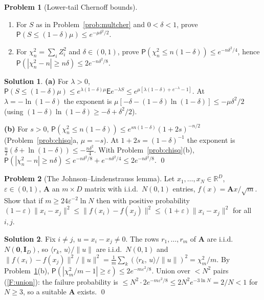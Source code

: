 \documentclass[12pt,a4paper]{article}
\theoremstyle{definition}
\newtheorem{exercise}{Problem}
\newtheorem*{solution*}{Solution}
\newcommand\expc{\mathsf{E}}
\newcommand\prb{\mathsf{P}}
\newcommand{\Real}{\mathbb{R}}
\newcommand{\bA}{\mathbf{A}}
\newcommand{\bI}{\mathbf{I}}
\newcommand{\bzero}{\mathbf{0}}
\newcommand{\ip}[2]{\langle #1,\, #2 \rangle}
\newcommand{\norm}[1]{\lVert #1 \rVert}
\begin{document}
\begin{exercise}[Lower-tail Chernoff bounds]\label{prob:lowertail}
\begin{enumerate}[label=(\alph*)]
\item For $S$ as in Problem~\ref{prob:multcher} and $0<\delta<1$, prove $\prb(S\le(1-\delta)\mu)\le e^{-\mu\delta^2/2}$.
\item For $\chi^2_n=\sum_iZ_i^2$ and $\delta\in(0,1)$, prove $\prb(\chi^2_n\le n(1-\delta))\le e^{-n\delta^2/4}$, hence $\prb(|\chi^2_n-n|\ge n\delta)\le2e^{-n\delta^2/8}$.
\end{enumerate}
\end{exercise}
\begin{solution*}
\textbf{(a)} For $\lambda>0$, $\prb(S\le(1-\delta)\mu)\le e^{\lambda(1-\delta)\mu}\expc e^{-\lambda S}\le e^{\mu[\lambda(1-\delta)+e^{-\lambda}-1]}$. At $\lambda=-\ln(1-\delta)$ the exponent is $\mu[-\delta-(1-\delta)\ln(1-\delta)]\le-\mu\delta^2/2$ (using $(1-\delta)\ln(1-\delta)\ge-\delta+\delta^2/2$).

\textbf{(b)} For $s>0$, $\prb(\chi^2_n\le n(1-\delta))\le e^{sn(1-\delta)}(1+2s)^{-n/2}$ (Problem~\ref{prob:chisq}a, $\mu=-s$). At $1+2s=(1-\delta)^{-1}$ the exponent is $\tfrac n2(\delta+\ln(1-\delta))\le-\tfrac{n\delta^2}4$. With Problem~\ref{prob:chisq}(b), $\prb(|\chi^2_n-n|\ge n\delta)\le e^{-n\delta^2/8}+e^{-n\delta^2/4}\le2e^{-n\delta^2/8}$. \qed
\end{solution*}

\begin{exercise}[The Johnson--Lindenstrauss lemma]\label{prob:jl}
Let $x_1,\ldots,x_N\in\Real^D$, $\varepsilon\in(0,1)$, $\bA$ an $m\times D$ matrix with i.i.d.\ $N(0,1)$ entries, $f(x)=\bA x/\sqrt m$. Show that if $m\ge24\varepsilon^{-2}\ln N$ then with positive probability $(1-\varepsilon)\norm{x_i-x_j}^2\le\norm{f(x_i)-f(x_j)}^2\le(1+\varepsilon)\norm{x_i-x_j}^2$ for all $i,j$.
\end{exercise}
\begin{solution*}
Fix $i\neq j$, $u=x_i-x_j\neq0$. The rows $r_1,\ldots,r_m$ of $\bA$ are i.i.d.\ $N(\bzero,\bI_D)$, so $\ip{r_k}{u}/\norm u$ are i.i.d.\ $N(0,1)$ and $\norm{f(x_i)-f(x_j)}^2/\norm u^2=\tfrac1m\sum_k(\ip{r_k}u/\norm u)^2=\chi^2_m/m$. By Problem~\ref{prob:lowertail}(b), $\prb(|\chi^2_m/m-1|\ge\varepsilon)\le2e^{-m\varepsilon^2/8}$. Union over $<N^2$ pairs (\ref{F:union}): the failure probability is $\le N^2\cdot2e^{-m\varepsilon^2/8}\le2N^2e^{-3\ln N}=2/N<1$ for $N\ge3$, so a suitable $\bA$ exists. \qed
\end{solution*}
\end{document}
